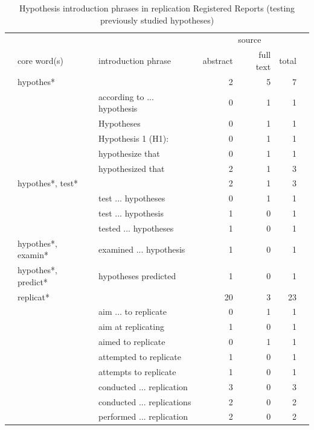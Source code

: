 \documentclass[british,,man,floatsintext]{apa6}
\begin{document}
\begin{table}[tbp]

\begin{center}
\begin{threeparttable}

\caption{\label{tab:unnamed-chunk-7}Hypothesis introduction phrases in replication Registered Reports (testing previously studied hypotheses)}

\scriptsize{

\begin{tabular}{lllrrrr}
\toprule
 &  &  & \multicolumn{3}{c}{source}  &\\
\cmidrule(r){4-6}
 & core word(s) & introduction phrase & abstract & full text & total & \\
\midrule
 & hypothes* &  & 2 & 5 & 7 & \\
 &  & according to ... hypothesis & 0 & 1 & 1 & \\
 &  & Hypotheses & 0 & 1 & 1 & \\
 &  & Hypothesis 1 (H1): & 0 & 1 & 1 & \\
 &  & hypothesize that & 0 & 1 & 1 & \\
 &  & hypothesized that & 2 & 1 & 3 & \\ \midrule
 & hypothes*, test* &  & 2 & 1 & 3 & \\
 &  & test ... hypotheses & 0 & 1 & 1 & \\
 &  & test ... hypothesis & 1 & 0 & 1 & \\
 &  & tested ... hypotheses & 1 & 0 & 1 & \\ \midrule
 & hypothes*, examin* & examined ... hypothesis & 1 & 0 & 1 & \\ \midrule
 & hypothes*, predict* & hypotheses predicted & 1 & 0 & 1 & \\ \midrule
 & replicat* &  & 20 & 3 & 23 & \\
 &  & aim ... to replicate & 0 & 1 & 1 & \\
 &  & aim at replicating & 1 & 0 & 1 & \\
 &  & aimed to replicate & 0 & 1 & 1 & \\
 &  & attempted to replicate & 1 & 0 & 1 & \\
 &  & attempts to replicate & 1 & 0 & 1 & \\
 &  & conducted ... replication & 3 & 0 & 3 & \\
 &  & conducted ... replications & 2 & 0 & 2 & \\
 &  & performed ... replication & 2 & 0 & 2 & \\

\end{tabular}}
\end{threeparttable}
\end{center}
\end{table}
\end{document}
